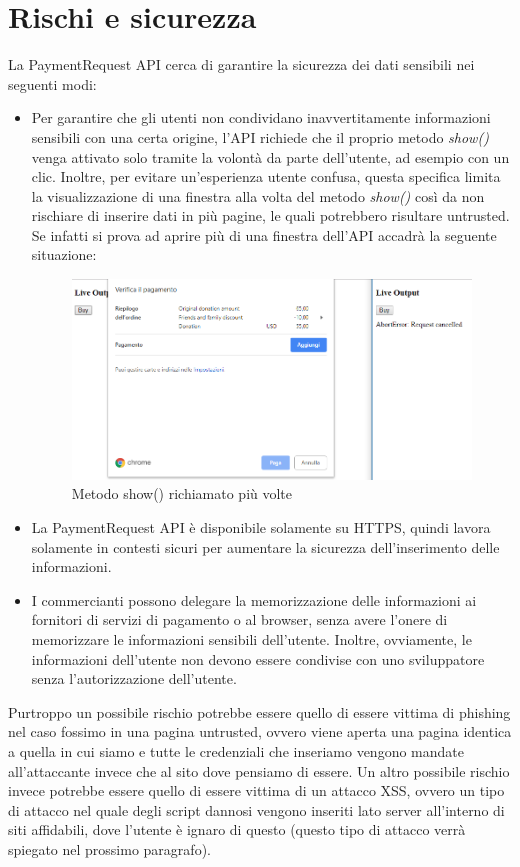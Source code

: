 \documentclass[11pt ,a4paper , twoside , openright ]{book}
\begin{document}
	\section[Rischi e sicurezza]{Rischi e sicurezza \cite{rif19}} 
	La PaymentRequest API cerca di garantire la sicurezza dei dati sensibili nei seguenti modi:
	
	\begin{itemize}
		\item Per garantire che gli utenti non condividano inavvertitamente informazioni sensibili con una certa origine, l'API richiede che il proprio metodo \textit{show()} venga attivato solo tramite la volontà da parte dell'utente, ad esempio con un clic. Inoltre, per evitare un'esperienza utente confusa, questa specifica limita la visualizzazione di una finestra alla volta del metodo \textit{show()} così da non rischiare di inserire dati in più pagine, le quali potrebbero risultare untrusted. 
		Se infatti si prova ad aprire più di una finestra dell'API accadrà la seguente situazione:
		
		\begin{figure}[h]
			\centering
			\includegraphics[width=0.5\linewidth]{Buy}
			\caption{Metodo show() richiamato più volte}
			\label{fig: Metodo show() richiamato più volte}
		\end{figure}
		
		
		\item La PaymentRequest API è disponibile solamente su HTTPS, quindi lavora solamente in contesti sicuri per aumentare la sicurezza dell'inserimento delle informazioni. 
		
		\item I commercianti possono delegare la memorizzazione delle informazioni ai fornitori di servizi di pagamento o al browser, senza avere l'onere di memorizzare le informazioni sensibili dell'utente. Inoltre, ovviamente, le informazioni dell'utente non devono essere condivise con uno sviluppatore senza l'autorizzazione dell'utente.
	\end{itemize}
	
	Purtroppo un possibile rischio potrebbe essere quello di essere vittima di phishing nel caso fossimo in una pagina untrusted, ovvero viene aperta una pagina identica a quella in cui siamo e tutte le credenziali che inseriamo vengono mandate all'attaccante invece che al sito dove pensiamo di essere. 
	Un altro possibile rischio invece potrebbe essere quello di essere vittima di un attacco XSS, ovvero un tipo di attacco nel quale degli script dannosi vengono inseriti lato server all'interno di siti affidabili, dove l'utente è ignaro di questo (questo tipo di attacco verrà spiegato nel prossimo paragrafo).
	
\end{document}
